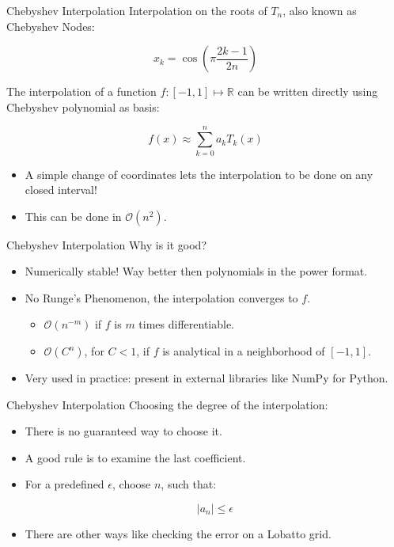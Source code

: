 \documentclass{beamer}
\newcommand{\R}{\mathbb{R}}
\newcommand{\bigO}{\mathscr{O}}
\begin{document}
\begin{frame}{Chebyshev Interpolation}
	Interpolation on the roots of $T_n$, also known as Chebyshev Nodes:
	
	\begin{equation*}
		x_k = \cos\left(\pi\frac{2k - 1}{2n}\right)
	\end{equation*}
	
	The interpolation of a function $f : [-1, 1] \mapsto \R$ can be written directly using Chebyshev polynomial as basis:
	
	\begin{equation*}
	f(x) \approx \sum_{k=0}^{n} a_k T_k(x)
	\end{equation*}
	
	\begin{itemize}
		\item A simple change of coordinates lets the interpolation to be done on any closed interval!
		\item This can be done in $\bigO(n^2)$.
	\end{itemize}
\end{frame}

\begin{frame}{Chebyshev Interpolation}
		Why is it good?
	
	\begin{itemize}
		\item Numerically stable! Way better then polynomials in the power format.
		
		\item No Runge's Phenomenon, the interpolation converges to $f$.
		\begin{itemize}
			\item $\bigO(n^{-m})$ if $f$ is $m$ times differentiable.
			\item $\bigO(C^n)$, for $C<1$, if $f$ is analytical in a neighborhood of $[-1, 1]$.
		\end{itemize}
		
		\item Very used in practice: present in external libraries like NumPy for Python.
	\end{itemize}
\end{frame}

\begin{frame}{Chebyshev Interpolation}
	Choosing the degree of the interpolation:
	
	\begin{itemize}
		\item There is no guaranteed way to choose it.
		\item A good rule is to examine the last coefficient.
		\item For a predefined $\epsilon$, choose $n$, such that:
		
		\begin{equation*}
		|a_n| \le \epsilon
		\end{equation*}
		
		\item There are other ways like checking the error on a Lobatto grid.
	\end{itemize}
\end{frame}
\end{document}
